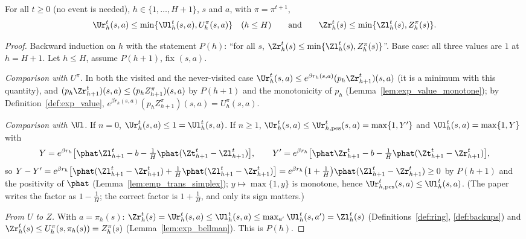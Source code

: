 \begin{lemma}\label{lem:ring_pos}
\leanok
{}
For all $t \ge 0$ (no event is needed), $h \in \{1, \dots, H + 1\}$, $s$ and $a$, with $\pi = \pi^{t+1}$,
\[
  \Ur_h^t(s,a) \le \min\{\Ul_h^t(s,a), U^\pi_h(s,a)\} \quad (h \le H)
  \qquad\text{and}\qquad
  \Zr_h^t(s) \le \min\{\Zl_h^t(s), Z^\pi_h(s)\} .
\]
\end{lemma}

\begin{proof}
\leanok
Backward induction on $h$ with the statement $P(h)$: ``for all $s$,
$\Zr_h^t(s) \le \min\{\Zl_h^t(s), Z^\pi_h(s)\}$''. Base case: all three values are $1$ at $h = H + 1$.
Let $h \le H$, assume $P(h+1)$, fix $(s,a)$.

\emph{Comparison with $U^\pi$.} In both the visited and the never-visited case
$\Ur_h^t(s,a) \le e^{\beta r_h(s,a)}(p_h\Zr^t_{h+1})(s,a)$ (it is a minimum with this quantity), and
$(p_h\Zr^t_{h+1})(s,a) \le (p_h Z^\pi_{h+1})(s,a)$ by $P(h+1)$ and the monotonicity of $p_h$
(Lemma~\ref{lem:exp_value_monotone}); by Definition~\ref{def:exp_value},
$e^{\beta r_h(s,a)}(p_h Z^\pi_{h+1})(s,a) = U^\pi_h(s,a)$.

\emph{Comparison with $\Ul$.} If $n = 0$, $\Ur_h^t(s,a) \le 1 = \Ul_h^t(s,a)$. If $n \ge 1$,
$\Ur_h^t(s,a) \le \Ur^t_{h,\mathrm{pes}}(s,a) = \max\{1, Y'\}$ and $\Ul_h^t(s,a) = \max\{1, Y\}$ with
\[
  Y = e^{\beta r_h}\big[\phat\Zl^t_{h+1} - b - \tfrac1H\phat(\Zt^t_{h+1} - \Zl^t_{h+1})\big], \qquad
  Y' = e^{\beta r_h}\big[\phat\Zr^t_{h+1} - b - \tfrac1H\phat(\Zt^t_{h+1} - \Zr^t_{h+1})\big],
\]
so $Y - Y' = e^{\beta r_h}\big[\phat(\Zl^t_{h+1} - \Zr^t_{h+1}) + \tfrac1H\phat(\Zl^t_{h+1} - \Zr^t_{h+1})\big]
= e^{\beta r_h}\big(1 + \tfrac1H\big)\phat(\Zl^t_{h+1} - \Zr^t_{h+1}) \ge 0$ by $P(h+1)$ and the
positivity of $\phat$ (Lemma~\ref{lem:emp_trans_simplex}); $y \mapsto \max\{1, y\}$ is monotone,
hence $\Ur^t_{h,\mathrm{pes}}(s,a) \le \Ul_h^t(s,a)$. (The paper writes the factor as $1 - \frac1H$; the
correct factor is $1 + \frac1H$, and only its sign matters.)

\emph{From $U$ to $Z$.} With $a = \pi_h(s)$: $\Zr_h^t(s) = \Ur_h^t(s, a) \le \Ul_h^t(s, a) \le \max_{a'}\Ul_h^t(s,a') = \Zl_h^t(s)$
(Definitions~\ref{def:ring}, \ref{def:backups}) and
$\Zr_h^t(s) \le U^\pi_h(s, \pi_h(s)) = Z^\pi_h(s)$ (Lemma~\ref{lem:exp_bellman}). This is $P(h)$.
\end{proof}

